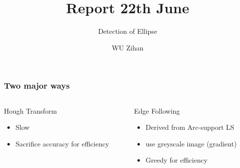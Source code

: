 \documentclass{beamer}
\title{Report 22th June}
\author{WU Zihan}
\subtitle{Detection of Ellipse}
\begin{document}
    \maketitle
    \begin{frame}
        \frametitle{Two major ways}
        
        \begin{columns}
            \begin{column}{.5\linewidth}
                Hough Transform
                \begin{itemize}
                    \item Slow
                    \item Sacrifice accuracy for efficiency
                \end{itemize}
            \end{column}
            \begin{column}{.5\linewidth}
                Edge Following
                \begin{itemize}
                    \item Derived from Arc-support LS 
                    \item use greyscale image (gradient)
                    \item Greedy for efficiency
                \end{itemize}
            \end{column}
        \end{columns}
    
    \end{frame}
\end{document}
